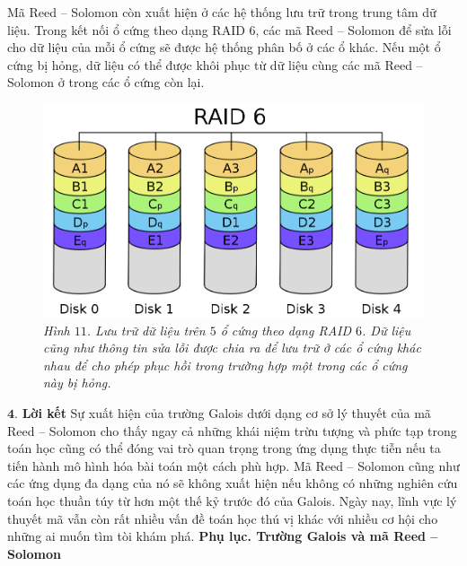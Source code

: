 \begin{multicols}{2}
\begin{figure}[H]
		\vspace*{-10pt}
	\end{figure}
	Mã Reed -- Solomon còn xuất hiện ở các hệ thống lưu trữ trong trung tâm dữ liệu. Trong kết nối ổ cứng theo dạng RAID $6$, các mã Reed -- Solomon để sửa lỗi cho dữ liệu của mỗi ổ cứng sẽ được hệ thống phân bố ở các ổ khác. Nếu một ổ cứng bị hỏng, dữ liệu có thể được khôi phục từ dữ liệu cùng các mã Reed -- Solomon ở trong các ổ cứng \linebreak còn lại. 
	\begin{figure}[H]
		\vspace*{-5pt}
		\centering
		\captionsetup{labelformat= empty, justification=centering}
		\includegraphics[width= 1\linewidth]{19}
		\caption{\small\textit{\color{toanhocdoisong}Hình $11$. Lưu trữ dữ liệu trên $5$ ổ cứng theo dạng RAID $6$. Dữ liệu cũng như thông tin sửa lỗi được chia ra để lưu trữ ở các ổ cứng khác nhau để cho phép phục hồi trong trường hợp một trong các ổ cứng này bị hỏng.}}
		\vspace*{-10pt}
	\end{figure}
	$\pmb{4.}$ \textbf{\color{toanhocdoisong}\color{toanhocdoisong}Lời kết}
	\vskip 0.05cm
	Sự xuất hiện của trường Galois dưới dạng cơ sở lý thuyết của mã Reed -- Solomon cho thấy ngay cả những khái niệm trừu tượng và phức tạp trong toán học cũng có thể đóng vai trò quan trọng trong ứng dụng thực tiễn nếu ta tiến hành mô hình hóa bài toán một cách phù hợp. Mã Reed -- Solomon cũng như các ứng dụng đa dạng của nó sẽ không xuất hiện nếu không có những nghiên cứu toán học thuần túy từ hơn một thế kỷ trước đó của Galois. Ngày nay, lĩnh vực lý thuyết mã vẫn còn rất nhiều vấn đề toán học thú vị khác với nhiều cơ hội cho những ai muốn tìm tòi \linebreak khám phá.
	\vskip 0.05cm
	\textbf{\color{toanhocdoisong}Phụ lục. Trường Galois và mã Reed -- Solomon}

\end{multicols}
